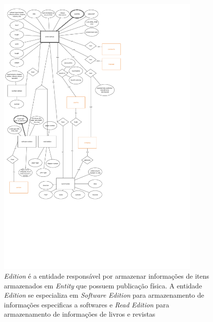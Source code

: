 \documentclass[12pt]{article}
\begin{document}
\begin{figure}[H]
\centering
\includegraphics[height=0.9\textheight,width=0.9\textwidth]{MER_-_Edition.pdf}
\caption{\textit{Edition} é a entidade responsável por armazenar informações de itens armazenados em \textit{Entity} que possuem publicação física. A entidade \textit{Edition} se especializa em \textit{Software Edition} para armazenamento de informações especificas a softwares e \textit{Read Edition} para armazenamento de informações de livros e revistas}\label{edition}
\end{figure}
\end{document}
